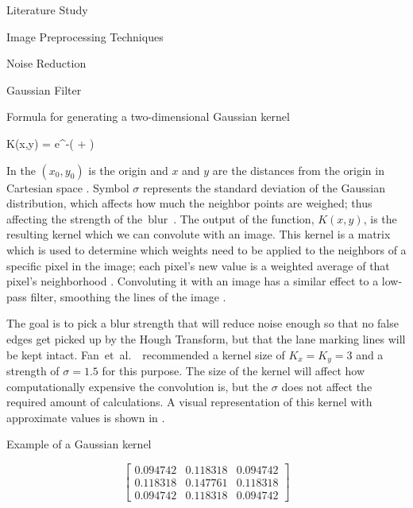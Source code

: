 \documentclass{matthijs}
\begin{document}
\begin{hoofdstuk}{Literature Study}
\begin{paragraaf}{Image Preprocessing Techniques}
\begin{subparagraaf}{Noise Reduction}
\begin{subsubparagraaf}{Gaussian Filter}
					\begin{figuur}{Formula for generating a two-dimensional Gaussian kernel}

						\begin{largequation}
							K(x,y) = e^{-( + )}
						\end{largequation}\cite{gedraite2011investigation}
					
					\end{figuur}

					\bigskip

					In  the $ (x_0,y_0) $ is the origin and $x$ and $y$ are the distances from the origin in Cartesian space \cite{gedraite2011investigation}.
					Symbol $\sigma$ represents the standard deviation of the Gaussian distribution, which affects how much the neighbor points are weighed; thus affecting the strength of \mbox{the blur \cite{haddad1991class}.}
					The output of the function, $K(x,y)$, is the resulting kernel which we can convolute with an image.
					This kernel is a matrix which is used to determine which weights need to be applied to the neighbors of a specific pixel in the image; each pixel's new value is a weighted average of that pixel's neighborhood \cite{gedraite2011investigation}.
					Convoluting it with an image has a similar effect to a low-pass filter, smoothing the lines of the image \cite{haddad1991class}\cite{ferreira2010imagej}.

					\bigskip

					The goal is to pick a blur strength that will reduce noise enough so that no false edges get picked up by the Hough Transform, but that the lane marking lines will be kept intact.
					\mbox{Fan et al. \cite{fan2016faster} recommended} a kernel size of $ K_x = K_y = 3 $ and a strength of $ \sigma = 1.5 $ for this purpose.
					The size of the kernel will affect how computationally expensive the convolution is, but the $\sigma$ does not affect the required amount of calculations.
					A visual representation of this kernel with approximate values is shown in .
					
					\begin{figuur}{Example of a Gaussian kernel}

						\vspace{-2ex}%

						\begin{equation*}
							\begin{bmatrix}
								0.094742 & 0.118318 & 0.094742 \\
								0.118318 & 0.147761 & 0.118318 \\
								0.094742 & 0.118318 & 0.094742 
							\end{bmatrix}
						\end{equation*}


\end{figuur}
\end{subsubparagraaf}
\end{subparagraaf}
\end{paragraaf}
\end{hoofdstuk}
\end{document}
